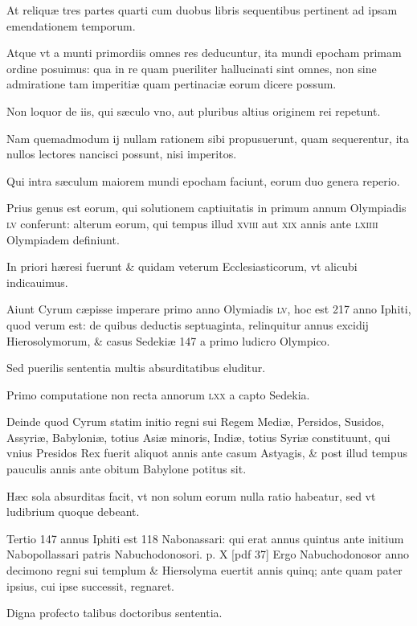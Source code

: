 \begin{parnumbers}
At reliquæ tres partes quarti cum duobus libris sequentibus pertinent ad ipsam emendationem temporum.

Atque vt a munti primordiis omnes res deducuntur, ita mundi epocham primam ordine posuimus: qua in re quam pueriliter hallucinati sint omnes, non sine admiratione tam imperitiæ quam pertinaciæ eorum dicere possum.

Non loquor de iis, qui sæculo vno, aut pluribus altius originem rei repetunt.

Nam quemadmodum ij nullam rationem sibi propusuerunt, quam sequerentur, ita nullos lectores nancisci possunt, nisi imperitos. 

Qui intra sæculum maiorem mundi epocham faciunt, eorum duo genera reperio.

Prius genus est eorum, qui solutionem captiuitatis in primum annum Olympiadis \textsc{lv} conferunt: alterum eorum, qui tempus illud \textsc{xviii} aut \textsc{xix} annis ante \textsc{lxiiii} Olympiadem definiunt.

In priori hæresi fuerunt \& quidam veterum Ecclesiasticorum, vt alicubi indicauimus. 

Aiunt Cyrum cæpisse imperare primo anno Olymiadis \textsc{lv}, hoc est 217 anno Iphiti, quod verum est: de quibus deductis septuaginta, relinquitur annus excidij Hierosolymorum, \& casus Sedekiæ 147 a primo ludicro Olympico.

Sed puerilis sententia multis absurditatibus eluditur.

Primo computatione non recta annorum \textsc{lxx} a capto Sedekia.

Deinde quod Cyrum statim initio regni sui Regem Mediæ, Persidos, Susidos, Assyriæ, Babyloniæ, totius Asiæ minoris, Indiæ, totius Syriæ constituunt, qui vnius Presidos Rex fuerit aliquot annis ante casum Astyagis, \& post illud tempus pauculis annis ante obitum Babylone potitus sit.

Hæc sola absurditas facit, vt non solum eorum nulla ratio habeatur, sed vt ludibrium quoque debeant.

Tertio 147 annus Iphiti est 118 Nabonassari: qui erat annus quintus ante initium Nabopollassari patris Nabuchodonosori.
\clearpage
p. X [pdf 37]
Ergo Nabuchodonosor anno decimono regni sui templum \& Hiersolyma euertit annis quinq;
ante quam pater ipsius, cui ipse successit, regnaret.

Digna profecto talibus doctoribus sententia.


\end{parnumbers}
